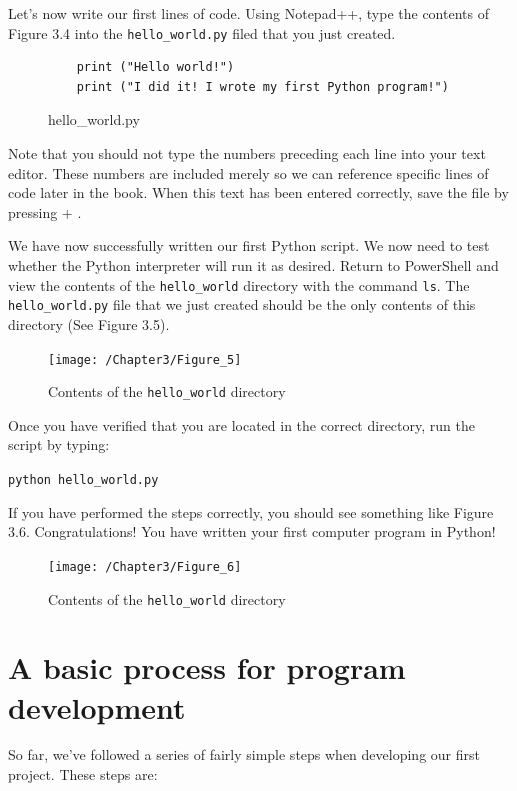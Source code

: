 \documentclass{book}
\begin{document}
Let's now write our first lines of code. Using Notepad++, type the contents of Figure 3.4 into the \texttt{hello\_world.py} filed that you just created.

\begin{figure}[h]
	\caption{hello\_world.py}
	\begin{lstlisting}
	print ("Hello world!")
	print ("I did it! I wrote my first Python program!")
	\end{lstlisting}
\end{figure}

Note that you should not type the numbers preceding each line into your text editor. These numbers are included merely so we can reference specific lines of code later in the book. When this text has been entered correctly, save the file by pressing  + . 

We have now successfully written our first Python script. We now need to test whether the Python interpreter will run it as desired. Return to PowerShell and view the contents of the \texttt{hello\_world} directory with the command \texttt{ls}. The \texttt{hello\_world.py} file that we just created should be the only contents of this directory (See Figure 3.5).\\

\begin{figure}[h]
	\caption{Contents of the \texttt{hello\_world} directory}
	\centering\texttt{[image: /Chapter3/Figure\_5]}
\end{figure}

Once you have verified that you are located in the correct directory, run the script by typing:

\texttt{python hello\_world.py}

If you have performed the steps correctly, you should see something like Figure 3.6. Congratulations! You have written your first computer program in Python!

\begin{figure}[h]
	\caption{Contents of the \texttt{hello\_world} directory}
	\centering\texttt{[image: /Chapter3/Figure\_6]}
\end{figure}

\section{A basic process for program development}

So far, we've followed a series of fairly simple steps when developing our first project. These steps are:
\end{document}
